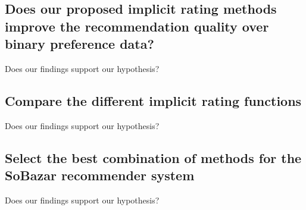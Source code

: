 {}

\Testur

\subsection{Does our proposed implicit rating methods improve the recommendation quality over binary preference data?}

Does our findings support our hypothesis?

\subsection{Compare the different implicit rating functions}

Does our findings support our hypothesis?

\subsection{Select the best combination of methods for the SoBazar recommender system}

Does our findings support our hypothesis?

